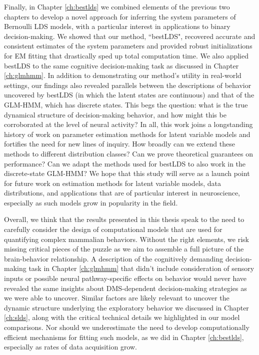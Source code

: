 Finally, in Chapter \ref{ch:bestlds} we combined elements of the previous two chapters to develop a novel approach for inferring the system parameters of Bernoulli LDS models, with a particular interest in applications to binary decision-making. We showed that our method, ``bestLDS", recovered accurate and consistent estimates of the system parameters and provided robust initializations for EM fitting that drastically sped up total computation time.  We also applied bestLDS to the same cognitive decision-making task as discussed in Chapter \ref{ch:glmhmm}. In addition to demonstrating our method's utility in real-world settings, our findings also revealed parallels between the descriptions of behavior uncovered by bestLDS (in which the latent states are continuous) and that of the GLM-HMM, which has discrete states. This begs the question: what is the true dynamical structure of decision-making behavior, and how might this be corroborated at the level of neural activity? In all, this work joins a longstanding history of work on parameter estimation methods for latent variable models \cite{martens_learning_2010, anandkumar_tensor_2014, belanger_linear_2015, hazan_learning_2017, hazan_spectral_2018} and fortifies the need for new lines of inquiry. How broadly can we extend these methods to different distribution classes? Can we prove theoretical guarantees on performance? Can we adapt the methods used for bestLDS to also work in the discrete-state GLM-HMM? We hope that this study will serve as a launch point for future work on estimation methods for latent variable models, data distributions, and applications that are of particular interest in neuroscience, especially as such models grow in popularity in the field.  

Overall, we think that the results presented in this thesis speak to the need to carefully consider the design of computational models that are used for quantifying complex mammalian behaviors. Without the right elements, we risk missing critical pieces of the puzzle as we aim to assemble a full picture of the brain-behavior relationship. A description of the cognitively demanding decision-making task in Chapter \ref{ch:glmhmm} that didn't include consideration of sensory inputs or possible neural pathway-specific effects on behavior would never have revealed the same insights about DMS-dependent decision-making strategies as we were able to uncover. Similar factors are likely relevant to uncover the dynamic structure underlying the exploratory behavior we discussed in Chapter \ref{ch:slds}, along with the critical technical details we highlighted in our model comparisons. Nor should we underestimate the need to develop computationally efficient mechanisms for fitting such models, as we did in Chapter \ref{ch:bestlds}, especially as rates of data acquisition grow.  

